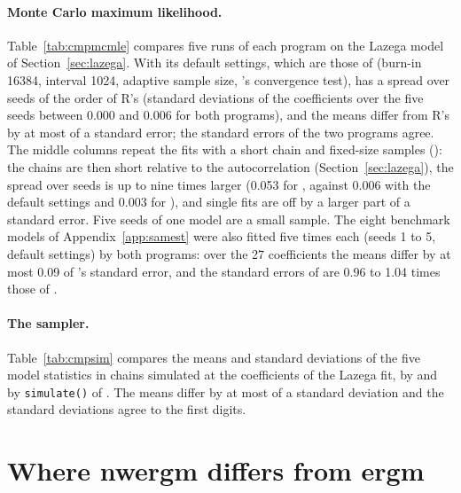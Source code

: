 \paragraph{Monte Carlo maximum likelihood.} Table~\ref{tab:cmpmcmle} compares five runs of each program on the Lazega model of Section~\ref{sec:lazega}. With its default settings, which are those of \ergm{} (burn-in 16384, interval 1024, adaptive sample size, \ergm{}'s convergence test), \nwergm{} has a spread over seeds of the order of R's (standard deviations of the coefficients over the five seeds between 0.000 and 0.006 for both programs), and the means differ from R's by at most \cmpMcmleSd{} of a standard error; the standard errors of the two programs agree. The middle columns repeat the fits with a short chain and fixed-size samples (): the chains are then short relative to the autocorrelation (Section~\ref{sec:lazega}), the spread over seeds is up to nine times larger (0.053 for , against 0.006 with the default settings and 0.003 for \ergm{}), and single fits are off by a larger part of a standard error. Five seeds of one model are a small sample. The eight benchmark models of Appendix~\ref{app:samest} were also fitted five times each (seeds 1 to 5, default settings) by both programs: over the 27 coefficients the means differ by at most 0.09 of \ergm{}'s standard error, and the standard errors of \nwergm{} are 0.96 to 1.04 times those of \ergm{}.

\paragraph{The sampler.} Table~\ref{tab:cmpsim} compares the means and standard deviations of the five model statistics in chains simulated at the coefficients of the Lazega fit, by \nwergm{} and by \texttt{simulate()} of \ergm{}. The means differ by at most \cmpSimRel{} of a standard deviation and the standard deviations agree to the first digits.



\section{Where nwergm differs from ergm}\label{sec:differs}

